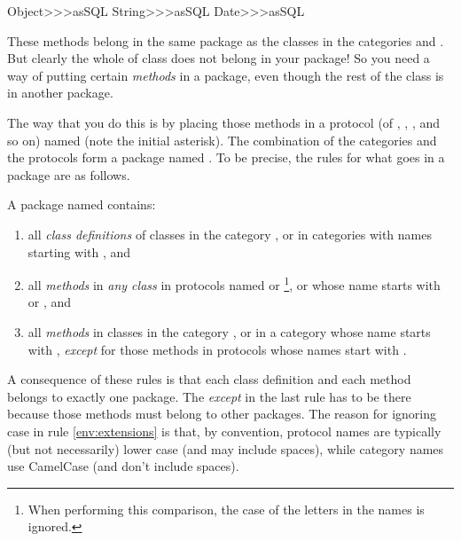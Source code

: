 \documentclass[a4paper,10pt,twoside]{book}
\begin{document}
\begin{code}{}
Object>>>asSQL
String>>>asSQL
Date>>>asSQL
\end{code}

\noindent
These methods belong in
the same package as the classes in the 
categories  and . 
But clearly the whole of class  does not belong in your package! 
So you need a way of putting certain \emph{methods} in a package, even though the rest of the class is in another package.

The way that you do this is by placing those methods in a protocol (of , , , and so on) named  (note the initial asterisk). The combination of the  categories and the  protocols form a package named .
To be precise, the rules for what goes in a package are as follows.

A package named  contains:

\begin{enumerate}		
	\item{} all \emph{class definitions} of classes in the category , or in categories with names starting with , and
	\item{} \label{env:extensions} all \emph{methods} in \emph{any class} in protocols named  or \footnote{When performing this comparison, the case of the letters in the names is ignored.}, or whose name starts with  or , and
	\item{} all \emph{methods} in classes in the category , or in a category whose name starts with , \emph{except} for those methods in protocols whose names start with \prot{*}.
	
\end{enumerate}
\noindent
A consequence of these rules is that each class definition and each method belongs to exactly one package. The \emph{except} in the last rule has to be there because those methods must belong to other packages.   The reason for ignoring case in rule \ref{env:extensions} is that, by convention, protocol names are typically (but not necessarily) lower case (and may include spaces), while category names use CamelCase (and don't include spaces).
\end{document}
